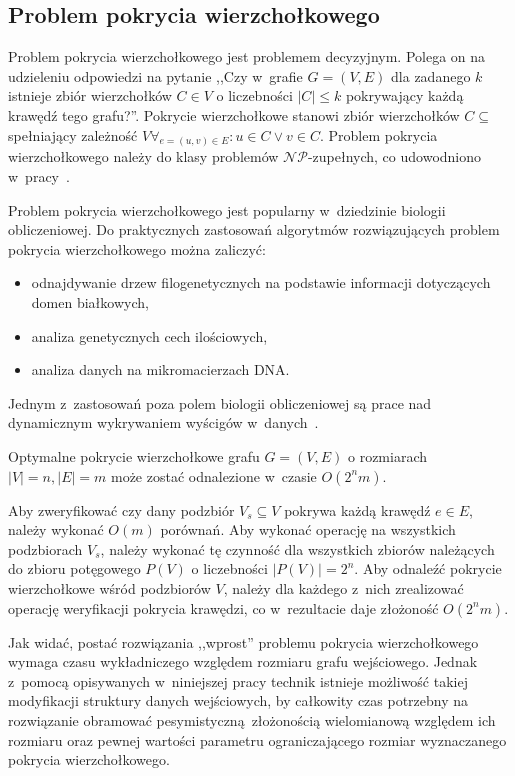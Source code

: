 \subsection{Problem pokrycia wierzchołkowego}\label{s_vertex_cover_domain}
\par{
  Problem pokrycia wierzchołkowego jest problemem decyzyjnym.
  Polega on na udzieleniu odpowiedzi na pytanie ,,Czy w~grafie $G=(V,E)$ dla zadanego $k$
  istnieje zbiór wierzchołków $C \in V$ o liczebności $|C| \leq k$ pokrywający każdą krawędź tego grafu?''.
  Pokrycie wierzchołkowe stanowi zbiór wierzchołków $C \subseteq$ spełniający zależność $V\forall_{e=(u,v) \in E}:u\in C\lor v\in C$.
  Problem pokrycia wierzchołkowego należy do klasy problemów $\mathcal{NP}$-zupełnych, co udowodniono w~pracy~\cite{Kar72}.
}
\par{
  Problem pokrycia wierzchołkowego jest popularny w~dziedzinie biologii obliczeniowej. 
  Do praktycznych zastosowań algorytmów rozwiązujących problem pokrycia wierzchołkowego można zaliczyć:
  \begin{itemize}
    \item odnajdywanie drzew filogenetycznych na podstawie informacji
      dotyczących domen białkowych,
    \item analiza genetycznych cech ilościowych,
    \item analiza danych na mikromacierzach DNA.\@
  \end{itemize}
  Jednym z~zastosowań poza polem biologii obliczeniowej są prace nad dynamicznym wykrywaniem wyścigów w~danych~\cite{O'Callahan:2003:HDD:781498.781528}.
}
\begin{theorem}
  Optymalne pokrycie wierzchołkowe grafu $G=(V,E)$ o rozmiarach $|V|=n, |E|=m$ może zostać odnalezione w~czasie $O(2^{n}m)$.
\end{theorem}
\begin{bproof}
  Aby zweryfikować czy dany podzbiór $V_s \subseteq V$ pokrywa każdą krawędź
  $e \in E$, należy wykonać $O(m)$ porównań.
  Aby wykonać operację na wszystkich podzbiorach $V_s$, należy wykonać tę
  czynność dla wszystkich zbiorów należących do zbioru potęgowego 
  $P(V)$ o liczebności $|P(V)| = 2^{n}$.
  Aby odnaleźć pokrycie wierzchołkowe wśród podzbiorów $V$, należy dla każdego z~nich zrealizować operację weryfikacji pokrycia krawędzi, co w~rezultacie daje 
  złożoność $O(2^{n}m)$.
\end{bproof}
\par{
  Jak widać, postać rozwiązania ,,wprost'' problemu pokrycia wierzchołkowego wymaga czasu wykładniczego względem rozmiaru grafu wejściowego.
  Jednak z~pomocą opisywanych w~niniejszej pracy technik istnieje możliwość takiej modyfikacji struktury danych wejściowych, by całkowity czas potrzebny na rozwiązanie obramować pesymistyczną~złożonością wielomianową względem ich rozmiaru oraz pewnej wartości parametru ograniczającego rozmiar wyznaczanego pokrycia wierzchołkowego.
}
